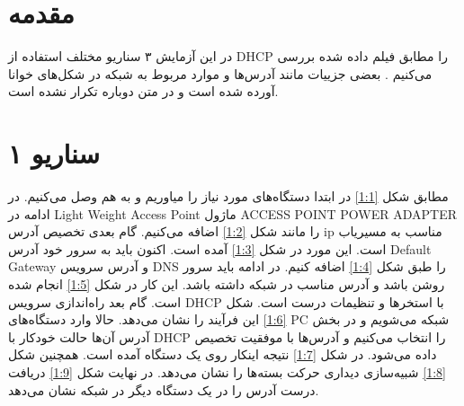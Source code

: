 \documentclass[12pt]{article}
\begin{document}
	\section{مقدمه}
	در این آزمایش ۳ سناریو مختلف استفاده از \textenglish{DHCP} را مطابق فیلم داده شده بررسی می‌کنیم \cite{a1}. بعضی جزییات مانند آدرس‌ها و موارد مربوط به شبکه در شکل‌های خوانا آورده شده است و در متن دوباره تکرار نشده است.
	
	\section{سناریو ۱}
	مطابق شکل \ref{1:1} در ابتدا دستگاه‌های مورد نیاز را میاوریم و به هم وصل می‌کنیم. در ادامه در \textenglish{Light Weight Access Point} ماژول \textenglish{ACCESS POINT POWER ADAPTER} را مانند شکل \ref{1:2} اضافه می‌کنیم. گام بعدی تخصیص آدرس \textenglish{ip} مناسب به مسیریاب است. این مورد در شکل \ref{1:3} آمده است. اکنون باید به سرور خود آدرس \textenglish{Default Gateway} و آدرس سرویس \textenglish{DNS} را طبق شکل \ref{1:4} اضافه کنیم. در ادامه باید سرور روشن باشد و آدرس مناسب در شبکه داشته باشد. این کار در شکل \ref{1:5} انجام شده است. گام بعد راه‌اندازی سرویس \textenglish{DHCP} با استخر‌ها و تنظیمات درست است. شکل \ref{1:6} این فرآیند را نشان می‌دهد. حالا وارد دستگاه‌های \textenglish{PC} شبکه می‌شویم و در بخش آدرس آن‌ها حالت خودکار با \textenglish{DHCP} را انتخاب می‌کنیم و آدرس‌ها با موفقیت تخصیص داده می‌شود. در شکل \ref{1:7} نتیجه اینکار روی یک دستگاه آمده است. همچنین شکل \ref{1:8} شبیه‌سازی دیداری حرکت بسته‌ها را نشان می‌دهد. در نهایت شکل \ref{1:9} دریافت درست آدرس را در یک دستگاه دیگر در شبکه نشان می‌دهد.
	
\end{document}

